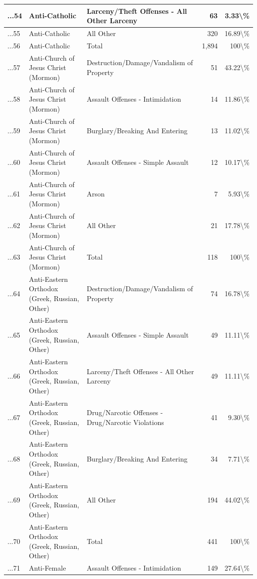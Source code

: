 \documentclass[
]{krantz}
\begin{document}
\begin{longtable}[t]{l|l|l|r|r}
\hline
...54 & Anti-Catholic & Larceny/Theft Offenses - All Other Larceny & 63 & 3.33\textbackslash{}\%\\
\hline
...55 & Anti-Catholic & All Other & 320 & 16.89\textbackslash{}\%\\
\hline
...56 & Anti-Catholic & Total & 1,894 & 100\textbackslash{}\%\\
\hline
...57 & Anti-Church of Jesus Christ (Mormon) & Destruction/Damage/Vandalism of Property & 51 & 43.22\textbackslash{}\%\\
\hline
...58 & Anti-Church of Jesus Christ (Mormon) & Assault Offenses - Intimidation & 14 & 11.86\textbackslash{}\%\\
\hline
...59 & Anti-Church of Jesus Christ (Mormon) & Burglary/Breaking And Entering & 13 & 11.02\textbackslash{}\%\\
\hline
...60 & Anti-Church of Jesus Christ (Mormon) & Assault Offenses - Simple Assault & 12 & 10.17\textbackslash{}\%\\
\hline
...61 & Anti-Church of Jesus Christ (Mormon) & Arson & 7 & 5.93\textbackslash{}\%\\
\hline
...62 & Anti-Church of Jesus Christ (Mormon) & All Other & 21 & 17.78\textbackslash{}\%\\
\hline
...63 & Anti-Church of Jesus Christ (Mormon) & Total & 118 & 100\textbackslash{}\%\\
\hline
...64 & Anti-Eastern Orthodox (Greek, Russian, Other) & Destruction/Damage/Vandalism of Property & 74 & 16.78\textbackslash{}\%\\
\hline
...65 & Anti-Eastern Orthodox (Greek, Russian, Other) & Assault Offenses - Simple Assault & 49 & 11.11\textbackslash{}\%\\
\hline
...66 & Anti-Eastern Orthodox (Greek, Russian, Other) & Larceny/Theft Offenses - All Other Larceny & 49 & 11.11\textbackslash{}\%\\
\hline
...67 & Anti-Eastern Orthodox (Greek, Russian, Other) & Drug/Narcotic Offenses - Drug/Narcotic Violations & 41 & 9.30\textbackslash{}\%\\
\hline
...68 & Anti-Eastern Orthodox (Greek, Russian, Other) & Burglary/Breaking And Entering & 34 & 7.71\textbackslash{}\%\\
\hline
...69 & Anti-Eastern Orthodox (Greek, Russian, Other) & All Other & 194 & 44.02\textbackslash{}\%\\
\hline
...70 & Anti-Eastern Orthodox (Greek, Russian, Other) & Total & 441 & 100\textbackslash{}\%\\
\hline
...71 & Anti-Female & Assault Offenses - Intimidation & 149 & 27.64\textbackslash{}\%\\

\end{longtable}
\end{document}
